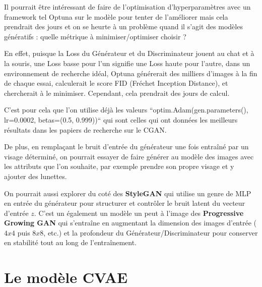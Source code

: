\documentclass{article}
\begin{document}
Il pourrait être intéressant de faire de l'optimisation d'hyperparamètres avec un framework tel Optuna sur le modèle pour tenter de l'améliorer mais cela prendrait des jours et on se heurte à un problème quand il s'agit des modèles génératifs : quelle métrique à minimiser/optimiser choisir ?

\noindent En effet, puisque la Loss du Générateur et du Discriminateur jouent au chat et à la souris, une Loss basse pour l'un signifie une Loss haute pour l'autre, dans un environnement de recherche idéal, Optuna générerait des milliers d'images à la fin de chaque essai, calculerait le score FID (Fréchet Inception Distance), et chercherait à le minimiser. Cependant, cela prendrait des jours de calcul.

\noindent C'est pour cela que l'on utilise déjà les valeurs ``optim.Adam(gen.parameters(), lr=0.0002, betas=(0.5, 0.999))`` qui sont celles qui ont données les meilleurs résultats dans les papiers de recherche sur le CGAN.

\medskip

De plus, en remplaçant le bruit d'entrée du générateur une fois entraîné par un visage déterminé, on pourrait essayer de faire générer au modèle des images avec les attributs que l'on souhaite, par exemple prendre son propre visage et y ajouter des lunettes.

\medskip

On pourrait aussi explorer du coté des \textbf{StyleGAN} qui utilise un genre de MLP en entrée du générateur pour structurer et contrôler le bruit latent du vecteur d'entrée $z$. C'est un également un modèle un peut à l'image des \textbf{Progressive Growing GAN} qui s'entraîne en augmentant la dimension des images d'entrée ($4x4$ puis $8x8$, etc.) et la profondeur du Générateur/Discriminateur pour conserver en stabilité tout au long de l'entraînement.

\newpage
\section{Le modèle CVAE}
\end{document}
